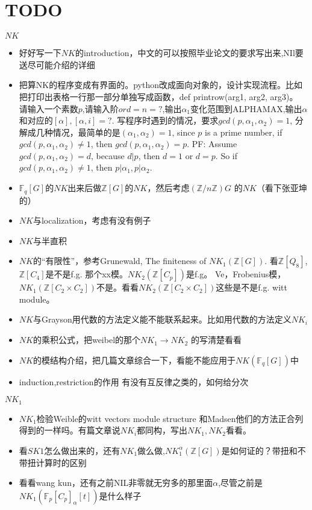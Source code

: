 \section{TODO}
$NK$
\begin{itemize}
	\item 好好写一下$NK$的introduction，中文的可以按照毕业论文的要求写出来,NIl要送尽可能介绍的详细
	\item 把算NK的程序变成有界面的。python改成面向对象的，设计实现流程。比如把打印出表格一行那一部分单独写成函数，def printrow(arg1, arg2, arg3)。 请输入一个素数$p$,请输入阶$ord=n=?$,输出$\alpha_1$变化范围到ALPHAMAX,输出$\alpha$和对应的$[\alpha],[\alpha,i]=?$.
	写程序时遇到的情况，要求$gcd(p,\alpha_1,\alpha_2)=1$, 分解成几种情况，最简单的是$(\alpha_1,\alpha_2)=1$, since $p$ is a prime number, if $gcd(p,\alpha_1,\alpha_2)\neq 1$, then $gcd(p,\alpha_1,\alpha_2)=p$. PF: Assume $gcd(p,\alpha_1,\alpha_2)=d$, because $d|p$, then $d=1$ or $d=p$. So if $gcd(p,\alpha_1,\alpha_2)\neq 1$, then $p|\alpha_1, p|\alpha_2$.
	\item $\mathbb{F}_q[G]$的$NK$出来后做$\mathbb{Z}[G]$的$NK$，然后考虑$(\mathbb{Z}/n\mathbb{Z}) G$ 的$NK$（看下张亚坤的）
	\item $NK$与localization，考虑有没有例子
	\item $NK$与半直积
	\item $NK$的“有限性”，参考Grunewald, The finiteness of $NK_1(\mathbb{Z}[G])$. 看$\mathbb{Z}[Q_8]$, $\mathbb{Z}[C_4]$是不是f.g. 那个xx模。$NK_2(\mathbb{Z}[C_p])$是f.g。
	 Ve，Frobenius模，$NK_1(\mathbb{Z}[C_2\times C_2])$不是。看看$NK_2(\mathbb{Z}[C_2\times C_2])$这些是不是f.g. witt module。
	\item $NK$与Grayson用代数的方法定义能不能联系起来。比如用代数的方法定义$NK_i$
	\item $NK$的乘积公式，把weibel的那个$NK_1\longrightarrow NK_2$ 的写清楚看看
	\item $NK$的模结构介绍，把几篇文章综合一下，看能不能应用于$NK(\mathbb{F}_q[G])$中
	\item induction,restriction的作用 有没有互反律之类的，如何给分次
\end{itemize}

$NK_1$
\begin{itemize}
	\item $NK_1$检验Weible的witt vectors module structure 和Madsen他们的方法正合列得到的一样吗。有篇文章说$NK_i$都同构，写出$NK_1,NK_2$看看。
	\item 看$SK1$怎么做出来的，还有$NK_1$做么做,$NK_1^\alpha(\mathbb{Z}[G])$是如何证的？带扭和不带扭计算时的区别
	\item 看看wang kun，还有之前NIL非零就无穷多的那里面$\alpha$,尽管之前是$NK_1( \mathbb{F}_p[C_p]_{\alpha}[t])$是什么样子
\end{itemize}

